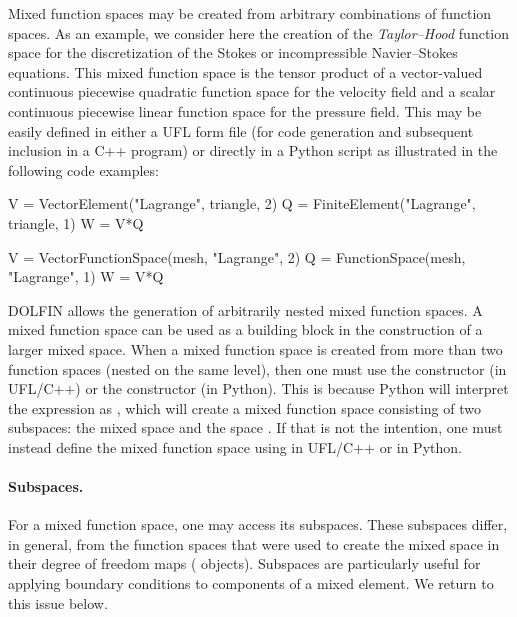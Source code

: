 Mixed function spaces may be created from arbitrary combinations of
function spaces. As an example, we consider here the creation of the
\emph{Taylor--Hood} function space for the discretization of the
Stokes or incompressible Navier--Stokes equations. This mixed function
space is the tensor product of a vector-valued continuous piecewise
quadratic function space for the velocity field and a scalar
continuous piecewise linear function space for the pressure
field. This may be easily defined in either a UFL form file (for code
generation and subsequent inclusion in a C++ program) or directly in a
Python script as illustrated in the following code examples:
\begin{uflcode}
V = VectorElement("Lagrange", triangle, 2)
Q = FiniteElement("Lagrange", triangle, 1)
W = V*Q
\end{uflcode}
%
\begin{python}
V = VectorFunctionSpace(mesh, "Lagrange", 2)
Q = FunctionSpace(mesh, "Lagrange", 1)
W = V*Q
\end{python}

DOLFIN allows the generation of arbitrarily nested mixed function
spaces. A mixed function space can be used as a building block in the
construction of a larger mixed space. When a mixed function space is
created from more than two function spaces (nested on the same level),
then one must use the  constructor (in UFL/C++) or
the  constructor (in Python). This is because
Python will interpret the expression  as ,
which will create a mixed function space consisting of two subspaces:
the mixed space  and the space . If that is not the
intention, one must instead define the mixed function space using
 in UFL/C++ or
 in Python.

\paragraph{Subspaces.}

For a mixed function space, one may access its subspaces. These
subspaces differ, in general, from the function spaces that were used to
create the mixed space in their degree of freedom maps (
objects). Subspaces are particularly useful for applying boundary
conditions to components of a mixed element. We return to this
issue below.

